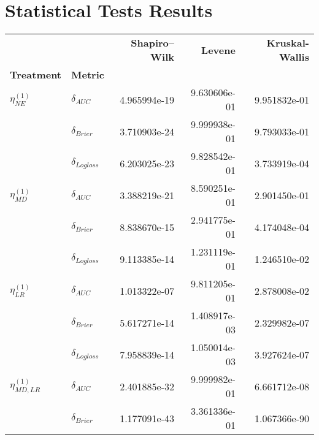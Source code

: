 \chapter{Statistical Tests Results}
\label{ape:statistical-tests}

\singlespacing

\renewcommand{\arraystretch}{0.85}
\captionsetup{margin=1.0cm}  %
\begin{table}[!h]
    \centering
    \begin{tabular}{l|lrrr}
    \toprule
                              &                    &  \textbf{Shapiro–Wilk} &  \textbf{Levene} &  \textbf{Kruskal-Wallis} \\
    \textbf{Treatment} & \textbf{Metric} &                        &                  &                          \\
    \midrule
    $\eta^{(1)}_{NE}$ & $\delta_{AUC}$ &           4.965994e-19 &     9.630606e-01 &             9.951832e-01 \\
                              & $\delta_{Brier}$ &           3.710903e-24 &     9.999938e-01 &             9.793033e-01 \\
                              & $\delta_{Logloss}$ &           6.203025e-23 &     9.828542e-01 &             3.733919e-04 \\
    $\eta^{(1)}_{MD}$ & $\delta_{AUC}$ &           3.388219e-21 &     8.590251e-01 &             2.901450e-01 \\
                              & $\delta_{Brier}$ &           8.838670e-15 &     2.941775e-01 &             4.174048e-04 \\
                              & $\delta_{Logloss}$ &           9.113385e-14 &     1.231119e-01 &             1.246510e-02 \\
    $\eta^{(1)}_{LR}$ & $\delta_{AUC}$ &           1.013322e-07 &     9.811205e-01 &             2.878008e-02 \\
                              & $\delta_{Brier}$ &           5.617271e-14 &     1.408917e-03 &             2.329982e-07 \\
                              & $\delta_{Logloss}$ &           7.958839e-14 &     1.050014e-03 &             3.927624e-07 \\
    $\eta^{(1)}_{MD, LR}$ & $\delta_{AUC}$ &           2.401885e-32 &     9.999982e-01 &             6.661712e-08 \\
                              & $\delta_{Brier}$ &           1.177091e-43 &     3.361336e-01 &             1.067366e-90 \\

\end{tabular}
\end{table}
